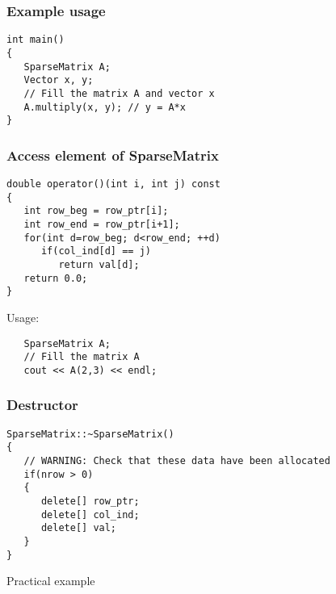 \documentclass[10pt,xcolor=svgnames]{beamer}
\begin{document}
\begin{frame}[fragile]
\frametitle{Example usage}

\begin{lstlisting}
int main()
{
   SparseMatrix A;
   Vector x, y;
   // Fill the matrix A and vector x
   A.multiply(x, y); // y = A*x
}
\end{lstlisting}

\end{frame}
\begin{frame}[fragile]
\frametitle{Access element of SparseMatrix}

\begin{lstlisting}
double operator()(int i, int j) const
{
   int row_beg = row_ptr[i];
   int row_end = row_ptr[i+1];
   for(int d=row_beg; d<row_end; ++d)
      if(col_ind[d] == j)
         return val[d];
   return 0.0;
}
\end{lstlisting}
Usage:
\begin{lstlisting}
   SparseMatrix A;
   // Fill the matrix A
   cout << A(2,3) << endl;
\end{lstlisting}

\end{frame}
\begin{frame}[fragile]
\frametitle{Destructor}

\begin{lstlisting}
SparseMatrix::~SparseMatrix()
{
   // WARNING: Check that these data have been allocated
   if(nrow > 0)
   {
      delete[] row_ptr;
      delete[] col_ind;
      delete[] val;
   }
}
\end{lstlisting}

\end{frame}
\begin{frame}

\begin{center}
\Huge Practical example
\end{center}

\end{frame}
\end{document}
